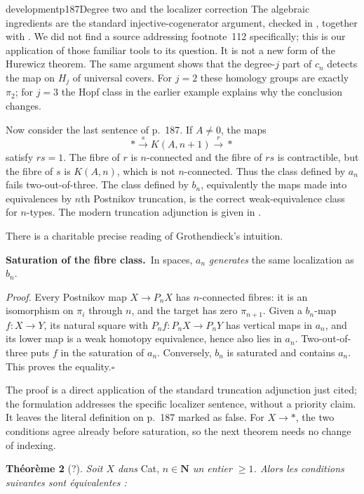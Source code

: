 \begin{dcomment}{development}{p187}{Degree two and the localizer correction}
The algebraic ingredients are the standard injective-cogenerator argument, checked in \citet[Tags 01D8 and 08WE]{StacksInjective2026}, together with \citet[Theorem~4.32]{Hatcher2002}. We did not find a source addressing footnote~112 specifically; this is our application of those familiar tools to its question. It is not a new form of the Hurewicz theorem. The same argument shows that the degree-$j$ part of $c_n$ detects the map on $H_j$ of universal covers. For $j=2$ these homology groups are exactly $\pi_2$; for $j=3$ the Hopf class in the earlier example explains why the conclusion changes.

Now consider the last sentence of p.~187. If $A\ne0$, the maps
\[
 *\xrightarrow{s}K(A,n+1)\xrightarrow{r}*
\]
satisfy $rs=1$. The fibre of $r$ is $n$-connected and the fibre of $rs$ is contractible, but the fibre of $s$ is $K(A,n)$, which is not $n$-connected. Thus the class defined by $a_n$ fails two-out-of-three. The class defined by $b_n$, equivalently the maps made into equivalences by $n$th Postnikov truncation, is the correct weak-equivalence class for $n$-types. The modern truncation adjunction is given in \citet[Proposition~5.5.6.18]{Lurie2009HTT}.

There is a charitable precise reading of Grothendieck's intuition.

\textbf{Saturation of the fibre class.}\ours\ In spaces, $a_n$ \emph{generates} the same localization as $b_n$.

\textit{Proof.} Every Postnikov map $X\to P_nX$ has $n$-connected fibres: it is an isomorphism on $\pi_i$ through $n$, and the target has zero $\pi_{n+1}$. Given a $b_n$-map $f:X\to Y$, its natural square with $P_nf:P_nX\to P_nY$ has vertical maps in $a_n$, and its lower map is a weak homotopy equivalence, hence also lies in $a_n$. Two-out-of-three puts $f$ in the saturation of $a_n$. Conversely, $b_n$ is saturated and contains $a_n$. This proves the equality.\hfill$\square$

The proof is a direct application of the standard truncation adjunction just cited; the formulation addresses the specific localizer sentence, without a priority claim. It leaves the literal definition on p.~187 marked as false. For $X\to *$, the two conditions agree already before saturation, so the next theorem needs no change of indexing.
\end{dcomment}


\textbf{Théorème 2} (?). \textit{Soit $X$ dans} Cat, \textit{$n \in \mathbf{N}$ un entier $\geq 1$. Alors les conditions suivantes sont équivalentes :}

